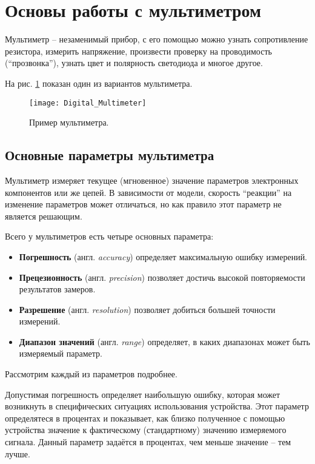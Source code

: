 \documentclass[../main.tex]{subfiles}
\begin{document}
\section{Основы работы с мультиметром}

Мультиметр -- незаменимый прибор, с его помощью можно узнать сопротивление
резистора, измерить напряжение, произвести проверку на проводимость
(``прозвонка''), узнать цвет и полярность светодиода и многое другое.

На рис. \ref{fig:multimeter-example} показан один из вариантов мультиметра.

\begin{figure}[ht]
  \centering
  \texttt{[image: Digital\_Multimeter]}
  \caption{Пример мультиметра.}
  \label{fig:multimeter-example}
\end{figure}

\subsection{Основные параметры мультиметра}

Мультиметр измеряет текущее (мгновенное) значение параметров электронных
компонентов или же цепей.  В зависимости от модели, скорость ``реакции'' на
изменение параметров может отличаться, но как правило этот параметр не является
решающим.

Всего у мультиметров есть четыре\cite{fluke:multimeter} основных параметра:
\begin{itemize}
\item \textbf{Погрешность} (англ. \emph{accuracy}) определяет максимальную
  ошибку измерений.
\item \textbf{Прецезионность} (англ. \emph{precision}) позволяет достичь высокой
  повторяемости результатов замеров.
\item \textbf{Разрешение} (англ. \emph{resolution}) позволяет добиться большей
  точности измерений.
\item \textbf{Диапазон значений} (англ. \emph{range}) определяет, в каких
  диапазонах может быть измеряемый параметр.
\end{itemize}

Рассмотрим каждый из параметров подробнее.

Допустимая погрешность определяет наибольшую ошибку, которая может возникнуть в
специфических ситуациях использования устройства.  Этот параметр определятеся в
процентах и показывает, как близко полученное с помощью устройства значение к
фактическому (стандартному) значению измеряемого сигнала.  Данный параметр
задаётся в процентах, чем меньше значение -- тем лучше.
\end{document}
